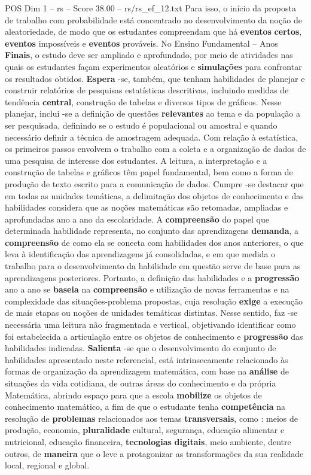 \begin{textsample}{POS Dim 1 – rs – Score 38.00 – rs/rs\_ef\_12.txt}
Para isso, o início da proposta de trabalho com probabilidade está concentrado no desenvolvimento da noção de aleatoriedade, de modo que os estudantes compreendam que há \textbf{eventos} \textbf{certos}, \textbf{eventos} impossíveis e \textbf{eventos} prováveis.
No Ensino Fundamental – Anos \textbf{Finais}, o estudo deve ser ampliado e aprofundado, por meio de atividades nas quais os estudantes façam experimentos aleatórios e \textbf{simulações} para confrontar os resultados obtidos. \textbf{Espera} -se, também, que tenham habilidades de planejar e construir relatórios de pesquisas estatísticas descritivas, incluindo medidas de tendência \textbf{central}, construção de tabelas e diversos tipos de gráficos.
Nesse planejar, inclui -se a definição de questões \textbf{relevantes} ao tema e da população a ser pesquisada, definindo se o estudo é populacional ou amostral e quando necessário definir a técnica de amostragem adequada.
Com relação à estatística, os primeiros passos envolvem o trabalho com a coleta e a organização de dados de uma pesquisa de interesse dos estudantes.
A leitura, a interpretação e a construção de tabelas e gráficos têm papel fundamental, bem como a forma de produção de texto escrito para a comunicação de dados.
Cumpre -se destacar que em todas as unidades temáticas, a delimitação dos objetos de conhecimento e das habilidades considera que as noções matemáticas são retomadas, ampliadas e aprofundadas ano a ano da escolaridade.
A \textbf{compreensão} do papel que determinada habilidade representa, no conjunto das aprendizagens \textbf{demanda}, a \textbf{compreensão} de como ela se conecta com habilidades dos anos anteriores, o que leva à identificação das aprendizagens já consolidadas, e em que medida o trabalho para o desenvolvimento da habilidade em questão serve de base para as aprendizagens posteriores.
Portanto, a definição das habilidades e a \textbf{progressão} ano a ano se \textbf{baseia} na \textbf{compreensão} e utilização de novas ferramentas e na complexidade das situações-problema propostas, cuja resolução \textbf{exige} a execução de mais etapas ou noções de unidades temáticas distintas.
Nesse sentido, faz -se necessária uma leitura não fragmentada e vertical, objetivando identificar como foi estabelecida a articulação entre os objetos de conhecimento e \textbf{progressão} das habilidades indicadas. \textbf{Salienta} -se que o desenvolvimento do conjunto de habilidades apresentado neste referencial, está intrinsecamente relacionado às formas de organização da aprendizagem matemática, com base na \textbf{análise} de situações da vida cotidiana, de outras áreas do conhecimento e da própria Matemática, abrindo espaço para que a escola \textbf{mobilize} os objetos de conhecimento matemático, a fim de que o estudante tenha \textbf{competência} na resolução de \textbf{problemas} relacionados aos temas \textbf{transversais}, como : meios de produção, economia, \textbf{pluralidade} cultural, segurança, educação alimentar e nutricional, educação financeira, \textbf{tecnologias} \textbf{digitais}, meio ambiente, dentre outros, de \textbf{maneira} que o leve a protagonizar as transformações da sua realidade local, regional e global.

\end{textsample}
